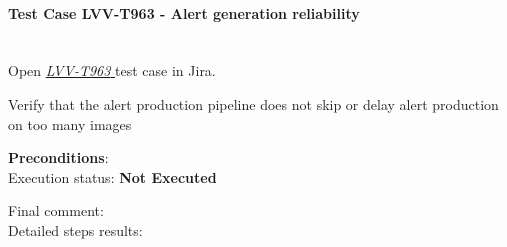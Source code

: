 \documentclass[DM,lsstdraft,STR,toc]{lsstdoc}
\begin{document}
\paragraph{Test Case LVV-T963 - Alert generation reliability
 }\mbox{}\\

Open  \href{https://jira.lsstcorp.org/secure/Tests.jspa#/testCase/LVV-T963}{\textit{ LVV-T963 } }
test case in Jira.

Verify that the alert production pipeline does not skip or delay alert
production on too many images


\textbf{ Preconditions}:\\


Execution status: {\bf Not Executed }

Final comment:\\


Detailed steps results:
\end{document}
